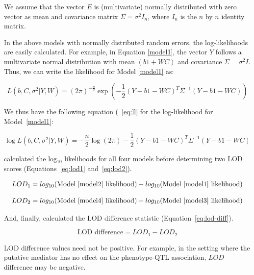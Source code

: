 \documentclass[oneside]{book}\usepackage[]{graphicx}\usepackage[]{color}
\begin{document}
We assume that the vector $E$ is (multivariate) normally 
distributed with zero vector as mean and covariance matrix 
$\Sigma = \sigma^2I_n$, where $I_n$ is the $n$ by $n$ 
identity matrix.

In the above models with normally distributed random 
errors, the log-likelihoods are easily calculated. For 
example, in Equation \ref{model1}, the vector $Y$ follows 
a multivariate normal distribution with mean $(b1 + WC)$ 
and covariance $\Sigma = \sigma^2I$. Thus, we can write 
the likelihood for Model \ref{model1} as:

\begin{equation}
    L(b, C, \sigma^2| Y, W) = (2\pi)^{- \frac{n}{2}}\exp{ \left(- \frac{1}{2}(Y - b1 - WC)^T\Sigma^{-1}(Y - b1 - WC)\right)}
\end{equation}

We thus have the following equation (~\ref{eq:ll} for the 
log-likelihood for Model~\ref{model1}:

\begin{equation}
    \log L(b, C, \sigma^2 | Y, W) = - \frac{n}{2}\log (2\pi) - \frac{1}{2} (Y - b1 - WC)^T\Sigma^{-1}(Y - b1 - WC)\label{eq:ll}
\end{equation}


\citet{chick2016defining} calculated the log$_{10}$ 
likelihoods for all four models before determining two LOD 
scores (Equations~\ref{eq:lod1} and~\ref{eq:lod2}).


\begin{equation}
LOD_1 = log_{10}(\text{Model~\ref{model2} likelihood}) - log_{10}(\text{Model~\ref{model1} likelihood})\label{eq:lod1}
\end{equation}

\begin{equation}
LOD_2 = log_{10}(\text{Model~\ref{model4} likelihood}) - log_{10}(\text{Model~\ref{model3} likelihood})\label{eq:lod2}
\end{equation}

And, finally, \citet{chick2016defining} calculated the LOD 
difference statistic (Equation~\ref{eq:lod-diff}).

\begin{equation}
\text{LOD difference} = LOD_1 - LOD_2\label{eq:lod-diff}
\end{equation}

LOD difference values need not be positive. 
For example, in the setting where the putative mediator has no effect on the phenotype-QTL association, $LOD$ difference may be negative. 
\end{document}

